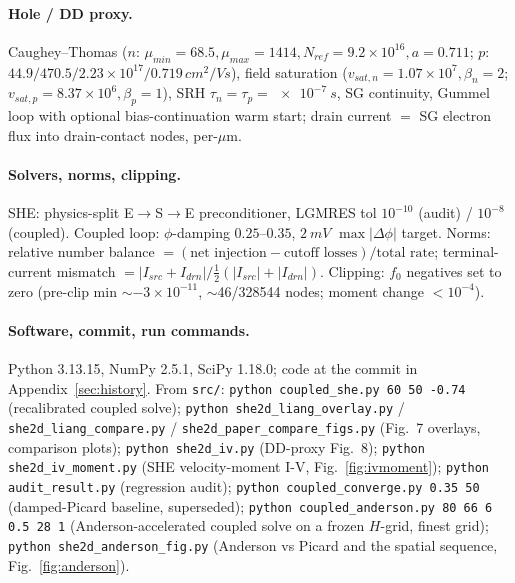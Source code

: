 \documentclass[11pt]{article}
\begin{document}
\paragraph{Hole / DD proxy.} Caughey--Thomas ($n$: $\mu_{min}{=}68.5,\mu_{max}{=}1414,
N_{ref}{=}9.2{\times}10^{16},a{=}0.711$; $p$: $44.9/470.5/2.23{\times}10^{17}/0.719\,\si{cm^2/Vs}$),
field saturation ($v_{sat,n}{=}1.07{\times}10^{7},\beta_n{=}2$; $v_{sat,p}{=}8.37{\times}10^{6},
\beta_p{=}1$), SRH $\tau_n{=}\tau_p{=}\SI{e-7}{s}$, SG continuity, Gummel loop with optional
bias-continuation warm start; drain current $=$ SG electron flux into drain-contact nodes, per-$\mu$m.

\paragraph{Solvers, norms, clipping.} SHE: physics-split E$\to$S$\to$E preconditioner, LGMRES tol
$10^{-10}$ (audit) / $10^{-8}$ (coupled). Coupled loop: $\phi$-damping $0.25$--$0.35$, $\SI{2}{mV}$
$\max|\Delta\phi|$ target. Norms: relative number balance $=(\text{net injection}-\text{cutoff
losses})/\text{total rate}$; terminal-current mismatch $=|I_{src}{+}I_{drn}|/\tfrac12(|I_{src}|{+}
|I_{drn}|)$. Clipping: $f_0$ negatives set to zero (pre-clip min $\sim-3\times10^{-11}$,
$\sim$46/328544 nodes; moment change $<10^{-4}$).

\paragraph{Software, commit, run commands.} Python 3.13.15, NumPy 2.5.1, SciPy 1.18.0; code at the
commit in Appendix~\ref{sec:history}. From \texttt{src/}: \texttt{python coupled\_she.py 60 50
-0.74} (recalibrated coupled solve); \texttt{python she2d\_liang\_overlay.py} /
\texttt{she2d\_liang\_compare.py} / \texttt{she2d\_paper\_compare\_figs.py} (Fig.~7 overlays,
comparison plots); \texttt{python she2d\_iv.py} (DD-proxy Fig.~8); \texttt{python she2d\_iv\_moment.py} (SHE
velocity-moment I-V, Fig.~\ref{fig:ivmoment}); \texttt{python audit\_result.py} (regression audit);
\texttt{python coupled\_converge.py 0.35 50} (damped-Picard baseline, superseded);
\texttt{python coupled\_anderson.py 80 66 6 0.5 28 1} (Anderson-accelerated coupled solve on a
frozen $H$-grid, finest grid); \texttt{python she2d\_anderson\_fig.py} (Anderson vs Picard and the
spatial sequence, Fig.~\ref{fig:anderson}).
\end{document}
